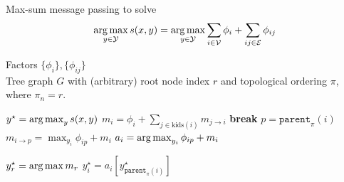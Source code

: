 \begin{algorithm} 
\caption[max-sum inference]{Max-sum message passing to solve $$\mathop{\arg\max}_{y \in 
\mathcal{Y}} s(x,y) = \mathop{\arg\max}_{y \in \mathcal{Y}} \sum_{i \in \mathcal{V}} \phi_i + \sum_{ij \in \mathcal{E}} 
\phi_{ij}$$} \label{alg:max-inference} \begin{algorithmic} 

\REQUIRE $ $ \\ 
Factors $\{\phi_i\}, \{\phi_{ij}\}$\\
Tree graph $G$ with (arbitrary) root node index $r$ and topological ordering $\pi$, where $\pi_n = r$.

\ENSURE $y^\star = \mathop{\arg\max}_{y} s(x,y)$ 
\STATE
$m_i = \phi_i + \sum_{j \in \text{kids}(i)} m_{j \rightarrow i}$
 \STATE \textbf{break} \ENDIF
\STATE
$p = \texttt{parent}_\pi(i) $
\STATE
$m_{i \rightarrow p} = \max_{y_i} \phi_{ip} + m_i$
\STATE
$a_i = \mathop{\arg\max}_{y_i} \phi_{ip} + m_i$
\ENDFOR

\STATE
$y^\star_r = \mathop{\arg\max} m_r$
\STATE $y^\star_i = a_i\left[y^\star_{\texttt{parent}_\pi(i)}\right]$
\ENDFOR

\end{algorithmic} 
\end{algorithm}

